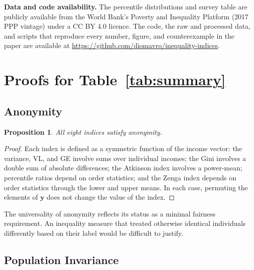 \documentclass[12pt]{article}
\theoremstyle{plain}
\newtheorem{proposition}[theorem]{Proposition}
\theoremstyle{definition}
\theoremstyle{remark}
\newcommand{\bfy}{\mathbf{y}}
\begin{document}
\noindent\textbf{Data and code availability.} The percentile distributions and survey table are publicly available from the World Bank's Poverty and Inequality Platform (2017 PPP vintage) under a CC BY 4.0 licence.
The code, the raw and processed data, and scripts that reproduce every number, figure, and counterexample in the paper are available at \url{https://github.com/diomavro/inequality-indices}.

\singlespacing




\clearpage
\onehalfspacing
\appendix

\section{Proofs for Table~\ref{tab:summary}}\label{app:table}
\setcounter{theorem}{0}
\renewcommand{\thetheorem}{A.\arabic{theorem}}

\subsection{Anonymity}

\begin{proposition}\label{prop:anon}
All eight indices satisfy anonymity.
\end{proposition}

\begin{proof}
Each index is defined as a symmetric function of the income vector: the variance, VL, and GE involve sums over individual incomes; the Gini involves a double sum of absolute differences; the Atkinson index involves a power-mean; percentile ratios depend on order statistics; and the Zenga index depends on order statistics through the lower and upper means.
In each case, permuting the elements of $\bfy$ does not change the value of the index.
\end{proof}

The universality of anonymity reflects its status as a minimal fairness requirement.
An inequality measure that treated otherwise identical individuals differently based on their label would be difficult to justify.

\subsection{Population Invariance}
\end{document}
